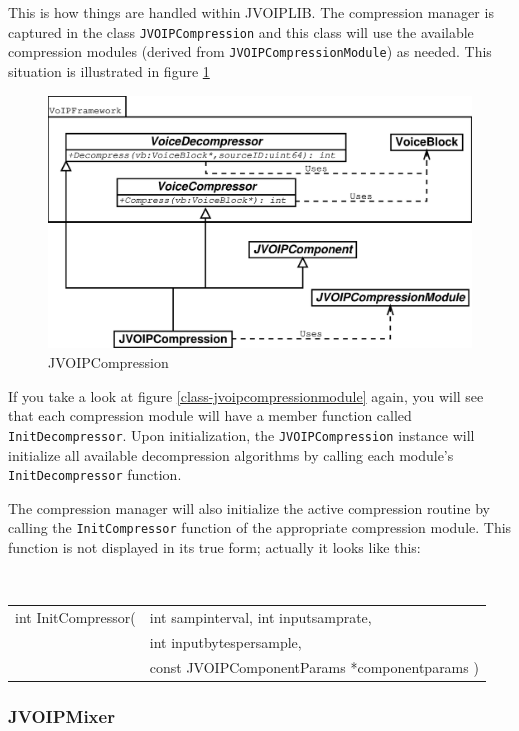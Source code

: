 			This is how things are handled within JVOIPLIB. The compression manager
			is captured in the class {\tt JVOIPCompression} and this class will use
			the available compression modules (derived from {\tt JVOIP\-Compression\-Module})
			as needed. This situation is illustrated in figure \ref{class-jvoipcompression}
			\begin{figure}
				\center
				\includegraphics[width=\linewidth]{images/manual/chapter2/class-jvoipcompression.eps}
				\caption{JVOIPCompression}
				\label{class-jvoipcompression}
			\end{figure}
			
			If you take a look at figure \ref{class-jvoipcompressionmodule} again,
			you will see that each compression module will have a member function
			called {\tt InitDecompressor}. Upon initialization, the {\tt JVOIP\-Com\-pres\-sion}
			instance will initialize all available decompression algorithms by
			calling each module's {\tt InitDecompressor} function.
			
			The compression manager will also initialize the active compression
			routine by calling the {\tt InitCompressor} function of the appropriate
			compression module. This function is not displayed in its true form;
			actually it looks like this:
			\begin{center}
				{\tt
				\begin{tabular}{rl}
				int InitCompressor(&int sampinterval, int inputsamprate,\\
				&int inputbytespersample,\\
				&const JVOIPComponentParams *componentparams )
				\end{tabular}
				}
			\end{center}
			
			\subsubsection{JVOIPMixer}
			
